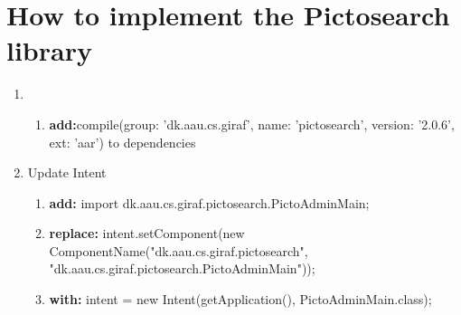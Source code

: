 \section{How to implement the Pictosearch library}
\begin{enumerate}
	\item 
	\begin{enumerate}
		\item \textbf{add:}compile(group: 'dk.aau.cs.giraf', name: 'pictosearch', version: '2.0.6', ext: 'aar') to dependencies
	\end{enumerate}
	\item Update Intent
	\begin{enumerate}
		\item \textbf{add:} import dk.aau.cs.giraf.pictosearch.PictoAdminMain;
		\item \textbf{replace:} intent.setComponent(new ComponentName("dk.aau.cs.giraf.pictosearch", "dk.aau.cs.giraf.pictosearch.PictoAdminMain"));
		\item \textbf{with:} intent = new Intent(getApplication(), PictoAdminMain.class);
	\end{enumerate}
\end{enumerate}